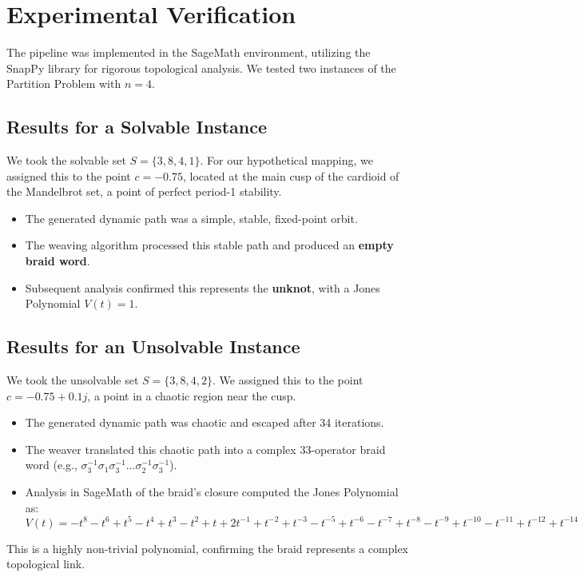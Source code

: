 \documentclass[11pt, a4paper]{article}
\begin{document}
\section{Experimental Verification}

The pipeline was implemented in the SageMath environment, utilizing the SnapPy library for rigorous topological analysis. We tested two instances of the Partition Problem with $n=4$.

\subsection{Results for a Solvable Instance}
We took the solvable set $S = \{3, 8, 4, 1\}$. For our hypothetical mapping, we assigned this to the point $c = -0.75$, located at the main cusp of the cardioid of the Mandelbrot set, a point of perfect period-1 stability.
\begin{itemize}
    \item The generated dynamic path was a simple, stable, fixed-point orbit.
    \item The weaving algorithm processed this stable path and produced an \textbf{empty braid word}.
    \item Subsequent analysis confirmed this represents the \textbf{unknot}, with a Jones Polynomial $V(t) = 1$.
\end{itemize}

\subsection{Results for an Unsolvable Instance}
We took the unsolvable set $S = \{3, 8, 4, 2\}$. We assigned this to the point $c = -0.75 + 0.1j$, a point in a chaotic region near the cusp.
\begin{itemize}
    \item The generated dynamic path was chaotic and escaped after 34 iterations.
    \item The weaver translated this chaotic path into a complex 33-operator braid word (e.g., $\sigma_3^{-1} \sigma_1 \sigma_3^{-1} ... \sigma_2^{-1} \sigma_3^{-1}$).
    \item Analysis in SageMath of the braid's closure computed the Jones Polynomial as: \\
    $V(t) = -t^8 - t^6 + t^5 - t^4 + t^3 - t^2 + t + 2t^{-1} + t^{-2} + t^{-3} - t^{-5} + t^{-6} - t^{-7} + t^{-8} - t^{-9} + t^{-10} - t^{-11} + t^{-12} + t^{-14}$
\end{itemize}
This is a highly non-trivial polynomial, confirming the braid represents a complex topological link.
\end{document}
